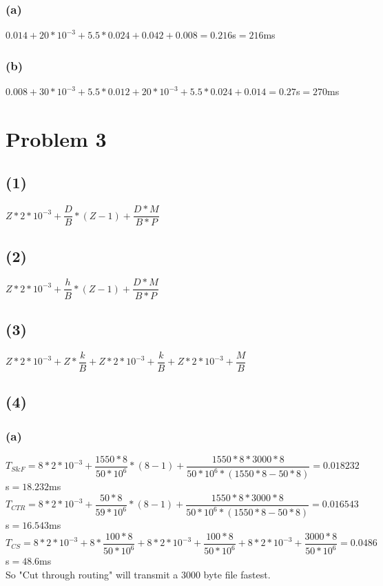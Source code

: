 \documentclass[11pt]{article}
\begin{document}
\subsubsection*{(a)}
$0.014+20*10^{-3}+5.5*0.024+0.042+0.008=0.216$s$=216$ms
\subsubsection*{(b)}
$0.008+30*10^{-3}+5.5*0.012+20*10^{-3}+5.5*0.024+0.014=0.27$s$=270$ms
\label{pg:end-of-p2}


%



\newpage

\section*{Problem 3}

\subsection*{(1)}
$Z*2*10^{-3}+\dfrac{D}{B}*(Z-1)+\dfrac{D*M}{B*P}$
\subsection*{(2)}
$Z*2*10^{-3}+\dfrac{h}{B}*(Z-1)+\dfrac{D*M}{B*P}$
\subsection*{(3)}
$Z*2*10^{-3}+Z*\dfrac{k}{B}+Z*2*10^{-3}+\dfrac{k}{B}+Z*2*10^{-3}+\dfrac{M}{B}$
\subsection*{(4)}
\subsubsection*{(a)}
$T_{S\&F}=8*2*10^{-3}+\dfrac{1550*8}{50*10^6}*(8-1)+\dfrac{1550*8*3000*8}{50*10^6*(1550*8-50*8)}=0.018232$s$=18.232$ms\\
$T_{CTR}=8*2*10^{-3}+\dfrac{50*8}{59*10^6}*(8-1)+\dfrac{1550*8*3000*8}{50*10^6*(1550*8-50*8)}=0.016543$s$=16.543$ms\\
$T_{CS}=8*2*10^{-3}+8*\dfrac{100*8}{50*10^6}+8*2*10^{-3}+\dfrac{100*8}{50*10^6}+8*2*10^{-3}+\dfrac{3000*8}{50*10^6}=0.0486$s$=48.6$ms\\
So "Cut through routing" will transmit a 3000 byte ﬁle fastest.
\end{document}
